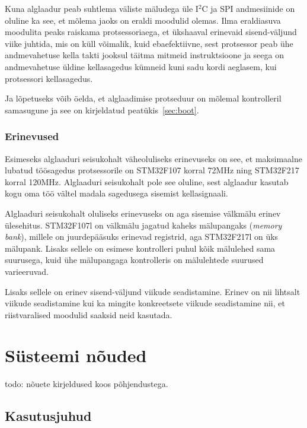 \documentclass[12pt,a4paper]{article}
\newcommand{\iic}{I\({}^2\)C }
\begin{document}
Kuna alglaadur peab suhtlema väliste mäludega üle \iic ja SPI andmesiinide on
oluline ka see, et mõlema jaoks on eraldi moodulid olemas. Ilma eraldiasuva
moodulita peaks raiskama protsessoriaega, et ükshaaval erinevaid sisend-väljund
viike juhtida, mis on küll võimalik, kuid ebaefektiivne, sest protsessor peab
ühe andmevahetuse kella takti jooksul täitma mitmeid instruktsioone ja seega
on andmevahetuse üldine kellasagedus kümneid kuni sadu kordi aeglasem, kui
protsessori kellasagedus.

Ja lõpetuseks võib öelda, et alglaadimise protseduur on mõlemal kontrolleril
samasugune ja see on kirjeldatud peatükis~\ref{sec:boot}.

\subsubsection{Erinevused}
Esimeseks alglaaduri seisukohalt väheoluliseks erinevuseks on see, et
maksimaalne lubatud töösagedus protsessorile on STM32F107 korral 72MHz ning
STM32F217 korral 120MHz. Alglaaduri seisukohalt pole see oluline, sest alglaadur
kasutab kogu oma töö vältel madala sagedusega sisemist kellasignaali.

Alglaaduri seisukohalt oluliseks erinevuseks on aga sisemise välkmälu erinev
ülesehitus. STM32F107l on välkmälu jagatud kaheks mälupangaks (\textit{memory
bank}), millele on juurdepääsuks erinevad registrid, aga STM32F217l on üks
mälupank. Lisaks sellele on esimese kontrolleri puhul kõik mälulehed sama
suurusega, kuid ühe mälupangaga kontrolleris on mälulehtede suurused
varieeruvad. \cite{f1fpm,f2fpm}

Lisaks sellele on erinev sisend-väljund viikude seadistamine. Erinev on nii
lihtsalt viikude seadistamine kui ka mingite konkreetsete viikude seadistamine
nii, et riistvaralised moodulid saaksid neid kasutada.

\section{Süsteemi nõuded}
todo: nõuete kirjeldused koos põhjendustega.
\subsection{Kasutusjuhud}
\end{document}
